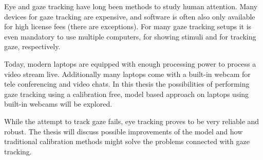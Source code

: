 Eye and gaze tracking have long been methods to study human attention. Many
devices for gaze tracking are expensive, and software is often also only
available for high license fees (there are exceptions). For many gaze tracking
setups it is even mandatory to use multiple computers, for showing stimuli and
for tracking gaze, respectively.

Today, modern laptops are equipped with enough processing power to process a
video stream live. Additionally many laptops come with a built-in webcam for
tele conferencing and video chats. In this thesis the possibilities of
performing gaze tracking using a calibration free, model based approach on
laptops using built-in webcams will be explored.

While the attempt to track gaze fails, eye tracking proves to be very reliable
and robust. The thesis will discuss possible improvements of the model and how
traditional calibration methods might solve the problems connected with gaze
tracking.
